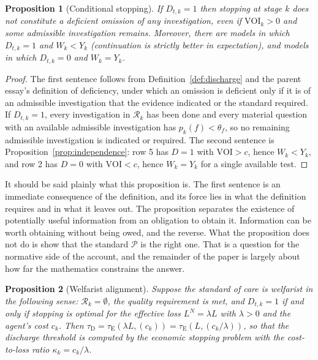 \documentclass[11pt]{article}
\newcommand{\tE}{\tau_{\mathrm E}}
\newcommand{\tD}{\tau_{\mathrm D}}
\theoremstyle{plain}
\newtheorem{proposition}{Proposition}
\theoremstyle{definition}
\begin{document}
\begin{proposition}[Conditional stopping]\label{prop:conditional}
If $D_{t,k}=1$ then stopping at stage $k$ does not constitute a deficient omission of any investigation, even if $\mathrm{VOI}_k>0$ and some admissible investigation remains. Moreover, there are models in which $D_{t,k}=1$ and $W_k<Y_k$ (continuation is strictly better in expectation), and models in which $D_{t,k}=0$ and $W_k=Y_k$.
\end{proposition}

\begin{proof}
The first sentence follows from Definition~\ref{def:discharge} and the parent essay's definition of deficiency, under which an omission is deficient only if it is of an admissible investigation that the evidence indicated or the standard required. If $D_{t,k}=1$, every investigation in $\mathcal R_k$ has been done and every material question with an available admissible investigation has $p_k(f)<\theta_f$, so no remaining admissible investigation is indicated or required. The second sentence is Proposition~\ref{prop:independence}: row 5 has $D=1$ with $\mathrm{VOI}>c$, hence $W_k<Y_k$, and row 2 has $D=0$ with $\mathrm{VOI}<c$, hence $W_k=Y_k$ for a single available test.
\end{proof}

It should be said plainly what this proposition is. The first sentence is an immediate consequence of the definition, and its force lies in what the definition requires and in what it leaves out. The proposition separates the existence of potentially useful information from an obligation to obtain it. Information can be worth obtaining without being owed, and the reverse. What the proposition does not do is show that the standard $\mathcal P$ is the right one. That is a question for the normative side of the account, and the remainder of the paper is largely about how far the mathematics constrains the answer.

\begin{proposition}[Welfarist alignment]\label{prop:welfarist}
Suppose the standard of care is \emph{welfarist} in the following sense: $\mathcal R_k=\emptyset$, the quality requirement is met, and $D_{t,k}=1$ if and only if stopping is optimal for the effective loss $L^{N}=\lambda L$ with $\lambda>0$ and the agent's cost $c_k$. Then $\tD=\tE(\lambda L,(c_k))=\tE(L,(c_k/\lambda))$, so that the discharge threshold is computed by the economic stopping problem with the cost-to-loss ratio $\kappa_k=c_k/\lambda$.
\end{proposition}
\end{document}
